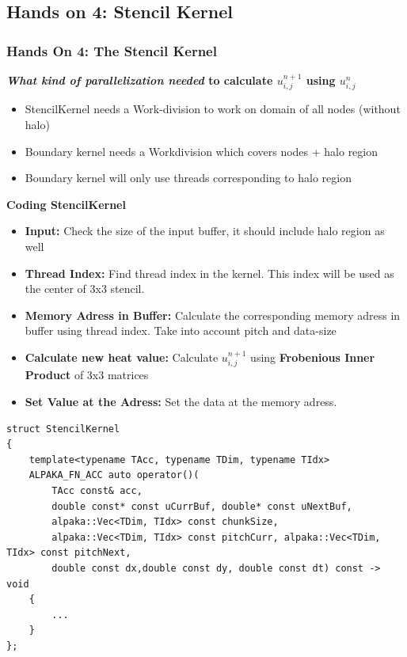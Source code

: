 \documentclass[9pt]{beamer}
\begin{document}
\subsection{Hands on 4: Stencil Kernel}
\begin{frame}[fragile]
\frametitle{Hands On 4: The Stencil Kernel}
\scriptsize
 \textbf{\textit{What kind of parallelization needed} to calculate  $u_{i,j}^{n+1}$ using $u_{i,j}^{n}$ }


    \begin{itemize}
        \item StencilKernel needs a Work-division to work on domain of all nodes (without halo)
        \item Boundary kernel needs a Workdivision which covers nodes + halo region
        \item Boundary kernel will only use threads corresponding to halo region
    \end{itemize}


\textbf{Coding StencilKernel }


    \begin{itemize}
    \item \textbf{Input:} Check the size of the input buffer, it should include halo region as well
    \item \textbf{Thread Index:} Find thread index in the kernel. This index will be used as the center of 3x3 stencil.
    \item \textbf{Memory Adress in Buffer:} Calculate the corresponding memory adress in buffer using thread index. Take into account pitch and data-size
    \item \textbf{Calculate new heat value:} Calculate $u_{i,j}^{n+1}$ using \textbf{Frobenious Inner Product} of 3x3 matrices
    \item \textbf{Set Value at the Adress:} Set the data at the memory adress.
    \end{itemize}
    \lstset{basicstyle=\ttfamily\tiny}
    \begin{lstlisting}
struct StencilKernel
{
    template<typename TAcc, typename TDim, typename TIdx>
    ALPAKA_FN_ACC auto operator()(
        TAcc const& acc,
        double const* const uCurrBuf, double* const uNextBuf,
        alpaka::Vec<TDim, TIdx> const chunkSize,
        alpaka::Vec<TDim, TIdx> const pitchCurr, alpaka::Vec<TDim, TIdx> const pitchNext,
        double const dx,double const dy, double const dt) const -> void
    {
        ...
    }
};
    \end{lstlisting}
\end{frame}
\end{document}
